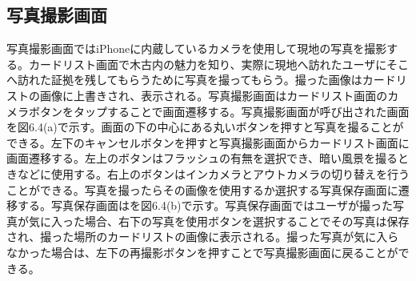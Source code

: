 \subsection{写真撮影画面}
写真撮影画面ではiPhoneに内蔵しているカメラを使用して現地の写真を撮影する。カードリスト画面で木古内の魅力を知り、実際に現地へ訪れたユーザにそこへ訪れた証拠を残してもらうために写真を撮ってもらう。撮った画像はカードリストの画像に上書きされ、表示される。写真撮影画面はカードリスト画面のカメラボタンをタップすることで画面遷移する。写真撮影画面が呼び出された画面を図6.4(a)で示す。画面の下の中心にある丸いボタンを押すと写真を撮ることができる。左下のキャンセルボタンを押すと写真撮影画面からカードリスト画面に画面遷移する。左上のボタンはフラッシュの有無を選択でき、暗い風景を撮るときなどに使用する。右上のボタンはインカメラとアウトカメラの切り替えを行うことができる。写真を撮ったらその画像を使用するか選択する写真保存画面に遷移する。写真保存画面はを図6.4(b)で示す。写真保存画面ではユーザが撮った写真が気に入った場合、右下の写真を使用ボタンを選択することでその写真は保存され、撮った場所のカードリストの画像に表示される。撮った写真が気に入らなかった場合は、左下の再撮影ボタンを押すことで写真撮影画面に戻ることができる。

